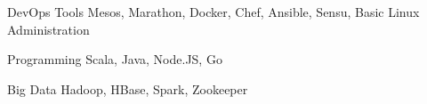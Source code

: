 

\begin{cvskills}

  \cvskill
    {DevOps Tools} %
    {Mesos, Marathon, Docker, Chef, Ansible, Sensu, Basic Linux Administration} %

  \cvskill
    {Programming} %
    {Scala, Java, Node.JS, Go} %

  \cvskill
    {Big Data} %
    {Hadoop, HBase, Spark, Zookeeper} %

\end{cvskills}
